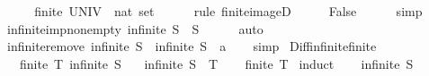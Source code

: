 \begin{isabellebody}
\ \ \isamarkupfalse%
\ \isamarkupfalse%
\ {\isachardoublequoteopen}finite\ {\isacharparenleft}{\kern0pt}UNIV\ {\isacharcolon}{\kern0pt}{\isacharcolon}{\kern0pt}\ nat\ set{\isacharparenright}{\kern0pt}{\isachardoublequoteclose}\isanewline
\ \ \ \ \isamarkupfalse%
\ {\isacharparenleft}{\kern0pt}rule\ finite{\isacharunderscore}{\kern0pt}imageD{\isacharparenright}{\kern0pt}\isanewline
\ \ \isamarkupfalse%
\ \isamarkupfalse%
\ False\isanewline
\ \ \ \ \isamarkupfalse%
\ simp\isanewline
{}\isamarkupfalse%
%
\endisatagproof
{\isafoldproof}%
%
\isadelimproof
\isanewline
%
\endisadelimproof
\isanewline
{}\isamarkupfalse%
\ infinite{\isacharunderscore}{\kern0pt}imp{\isacharunderscore}{\kern0pt}nonempty{\isacharcolon}{\kern0pt}\ {\isachardoublequoteopen}infinite\ S\ {\isasymLongrightarrow}\ S\ {\isasymnoteq}\ {\isacharbraceleft}{\kern0pt}{\isacharbraceright}{\kern0pt}{\isachardoublequoteclose}\isanewline
%
\isadelimproof
\ \ %
\endisadelimproof
%
\isatagproof
{}\isamarkupfalse%
\ auto%
\endisatagproof
{\isafoldproof}%
%
\isadelimproof
\isanewline
%
\endisadelimproof
\isanewline
{}\isamarkupfalse%
\ infinite{\isacharunderscore}{\kern0pt}remove{\isacharcolon}{\kern0pt}\ {\isachardoublequoteopen}infinite\ S\ {\isasymLongrightarrow}\ infinite\ {\isacharparenleft}{\kern0pt}S\ {\isacharminus}{\kern0pt}\ {\isacharbraceleft}{\kern0pt}a{\isacharbraceright}{\kern0pt}{\isacharparenright}{\kern0pt}{\isachardoublequoteclose}\isanewline
%
\isadelimproof
\ \ %
\endisadelimproof
%
\isatagproof
{}\isamarkupfalse%
\ simp%
\endisatagproof
{\isafoldproof}%
%
\isadelimproof
\isanewline
%
\endisadelimproof
\isanewline
{}\isamarkupfalse%
\ Diff{\isacharunderscore}{\kern0pt}infinite{\isacharunderscore}{\kern0pt}finite{\isacharcolon}{\kern0pt}\isanewline
\ \ \ {\isachardoublequoteopen}finite\ T{\isachardoublequoteclose}\ {\isachardoublequoteopen}infinite\ S{\isachardoublequoteclose}\isanewline
\ \ \ {\isachardoublequoteopen}infinite\ {\isacharparenleft}{\kern0pt}S\ {\isacharminus}{\kern0pt}\ T{\isacharparenright}{\kern0pt}{\isachardoublequoteclose}\isanewline
%
\isadelimproof
\ \ %
\endisadelimproof
%
\isatagproof
{}\isamarkupfalse%
\ {\isacartoucheopen}finite\ T{\isacartoucheclose}\isanewline
{}\isamarkupfalse%
\ induct\isanewline
\ \ \isamarkupfalse%
\ {\isacartoucheopen}infinite\ S{\isacartoucheclose}\ \isamarkupfalse%

\end{isabellebody}
